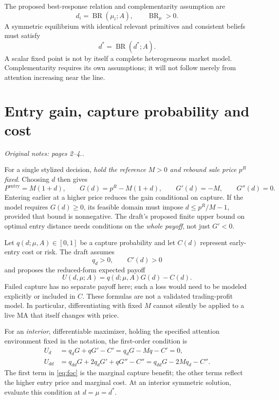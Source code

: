\documentclass[11pt,a4paper]{article}
\newcommand{\BR}{\operatorname{BR}}
\newcommand{\sourcepage}[1]{\textit{Original notes: #1.}}
\begin{document}
The proposed best-response relation and complementarity assumption are
\begin{equation}
 d_i=\BR(\mu_i;A),\qquad \BR_\mu>0.
\end{equation}
A symmetric equilibrium with identical relevant primitives and consistent beliefs
must satisfy
\begin{equation}\label{eq:fixedpoint}
 d^*=\BR(d^*;A).
\end{equation}
A scalar fixed point is not by itself a complete heterogeneous market model.
Complementarity requires its own assumptions; it will not follow merely from
attention increasing near the line.

\section{Entry gain, capture probability and cost}
\sourcepage{pages 2--4.}

For a single stylized decision, \emph{hold the reference $M>0$ and rebound sale
price $p^R$ fixed}. Choosing $d$ then gives
\begin{equation}
 P^{\mathrm{entry}}=M(1+d),\qquad
 G(d)=p^R-M(1+d),\qquad G'(d)=-M,\qquad G''(d)=0.
\end{equation}
Entering earlier at a higher price reduces the gain conditional on capture.
If the model requires $G(d)\geq0$, its feasible domain must impose
$d\leq p^R/M-1$, provided that bound is nonnegative. The draft's proposed
finite upper bound on optimal entry distance needs conditions on the
\emph{whole payoff}, not just $G'<0$.

Let $q(d;\mu,A)\in[0,1]$ be a capture probability and let $C(d)$ represent
early-entry cost or risk. The draft assumes
\begin{equation}
 q_d>0,\qquad C'(d)>0
\end{equation}
and proposes the reduced-form expected payoff
\begin{equation}\label{eq:payoff}
 U(d,\mu;A)=q(d;\mu,A)G(d)-C(d).
\end{equation}
Failed capture has no separate payoff here; such a loss would need to be
modeled explicitly or included in $C$. These formulas are not a validated
trading-profit model. In particular, differentiating with fixed $M$ cannot
silently be applied to a live MA that itself changes with price.

For an \emph{interior}, differentiable maximizer, holding the specified attention
environment fixed in the notation, the first-order condition is
\begin{align}
 U_d&=q_dG+qG'-C'=q_dG-Mq-C'=0, \label{eq:foc}\\
 U_{dd}&=q_{dd}G+2q_dG'+qG''-C''
       =q_{dd}G-2Mq_d-C''. \label{eq:soc}
\end{align}
The first term in \eqref{eq:foc} is the marginal capture benefit; the other
terms reflect the higher entry price and marginal cost. At an interior symmetric
solution, evaluate this condition at $d=\mu=d^*$.
\end{document}
